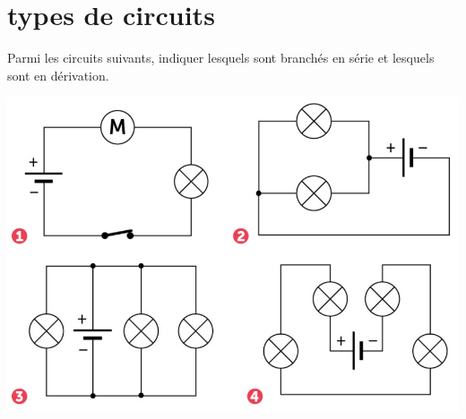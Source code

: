 \section{types de circuits}

Parmi les circuits suivants, indiquer lesquels sont branchés en série et lesquels sont en dérivation.

\begin{center}
	\includegraphics[scale=0.43]{img/circuits}
\end{center}